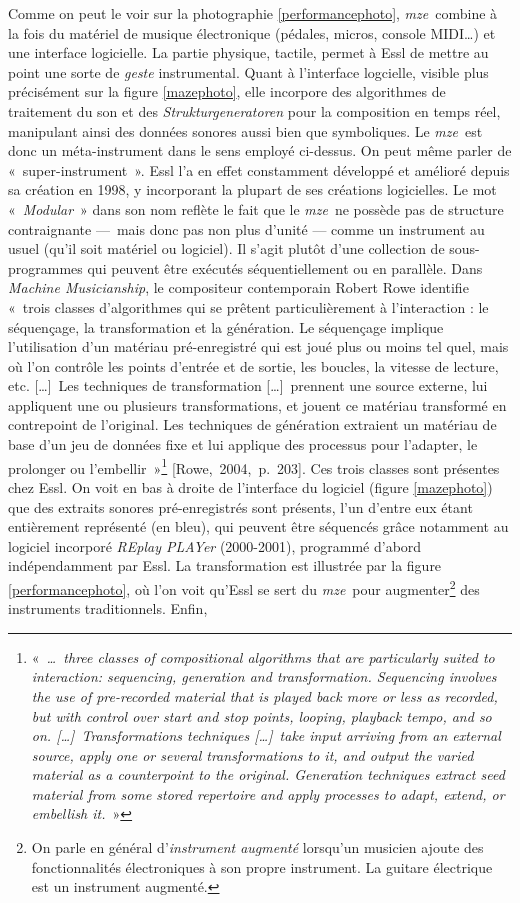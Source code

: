 \documentclass[a4paper,12pt]{article}
\newcommand{\guill}[1]{«~#1~»}
\newcommand{\maze}[0]{\emph{m\symbol{64}ze\textdegree2}}
\newcommand{\tpp}[0]{[\dots]}
\newcommand{\cicite}[1]{{\footnotesize[#1]}}
\begin{document}
Comme on peut le voir sur la photographie \ref{performancephoto}, \maze~combine à la fois du matériel de musique électronique (pédales, micros, console MIDI\dots) et une interface logicielle. La partie physique, tactile, permet à Essl de mettre au point une sorte de \emph{geste} instrumental. Quant à l'interface logcielle, visible plus précisément sur la figure \ref{mazephoto}, elle incorpore des algorithmes de traitement du son et des \emph{Strukturgeneratoren} pour la composition en temps réel, manipulant ainsi des données sonores aussi bien que symboliques. Le \maze~est donc un méta-instrument dans le sens employé ci-dessus. On peut même parler de \guill{super-instrument}. Essl l'a en effet constamment développé et amélioré depuis sa création en 1998, y incorporant la plupart de ses créations logicielles. Le mot \guill{\emph{Modular}} dans son nom reflète le fait que le \maze~ne possède pas de structure contraignante ---~mais donc pas non plus d'unité --- comme un instrument au usuel (qu'il soit matériel ou logiciel). Il s'agit plutôt d'une collection de sous-programmes qui peuvent être exécutés séquentiellement ou en parallèle. Dans \emph{Machine Musicianship}, le compositeur contemporain Robert Rowe identifie \guill{trois classes d'algorithmes qui se prêtent particulièrement à l'interaction : le séquençage, la transformation et la génération. Le séquençage implique l'utilisation d'un matériau pré-enregistré qui est joué plus ou moins tel quel, mais où l'on contrôle les points d'entrée et de sortie, les boucles, la vitesse de lecture, etc. \tpp~Les techniques de transformation \tpp~prennent une source externe, lui appliquent une ou plusieurs transformations, et jouent ce matériau transformé en contrepoint de l'original. Les techniques de génération extraient un matériau de base d'un jeu de données fixe et lui applique des processus pour l'adapter, le prolonger ou l'embellir}\footnote{\guill{\emph{\dots~three classes of compositional algorithms that are particularly suited to interaction\!: sequencing, generation and transformation. Sequencing involves the use of pre-recorded material that is played back more or less as recorded, but with control over start and stop points, looping, playback tempo, and so on. \tpp~Transformations techniques \tpp~take input arriving from an external source, apply one or several transformations to it, and output the varied material as a counterpoint to the original. Generation techniques extract seed material from some stored repertoire and apply processes to adapt, extend, or embellish it.}}} \cicite{Rowe,~2004,~p.~203}. Ces trois classes sont présentes chez Essl. On voit en bas à droite de l'interface du logiciel (figure \ref{mazephoto}) que des extraits sonores pré-enregistrés sont présents, l'un d'entre eux étant entièrement représenté (en bleu), qui peuvent être séquencés grâce notamment au logiciel incorporé \emph{REplay PLAYer} (2000-2001), programmé d'abord indépendamment par Essl. La transformation est illustrée par la figure \ref{performancephoto}, où l'on voit qu'Essl se sert du \maze~pour augmenter\footnote{On parle en général d'\emph{instrument augmenté} lorsqu'un musicien ajoute des fonctionnalités électroniques à son propre instrument. La guitare électrique est un instrument augmenté.} des instruments traditionnels. Enfin, 
\end{document}
